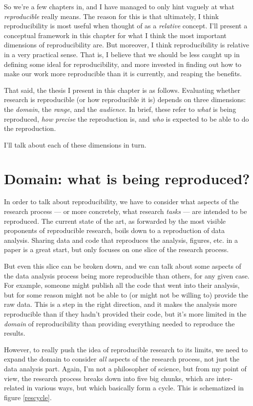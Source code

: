 \documentclass{book}
\begin{document}
So we're a few chapters in, and I have managed to only hint vaguely at what \emph{reproducible} really means.  The reason for this is that ultimately, I think reproducibility is most useful when thought of as a \emph{relative} concept. I'll present a conceptual framework in this chapter for what I think the most important dimensions of reproducibility are. But moreover, I think reproducibility is relative in a very practical sense. That is, I believe that we should be less caught up in defining some ideal for reproducibility, and more invested in finding out how to make our work more reproducible than it is currently, and reaping the benefits.

That said, the thesis I present in this chapter is as follows. Evaluating whether research is reproducible (or how reproducible it is) depends on three dimensions: the \emph{domain}, the \emph{range}, and the \emph{audience}.  In brief, these refer to \emph{what} is being reproduced, \emph{how precise} the reproduction is, and \emph{who} is expected to be able to do the reproduction. 

I'll talk about each of these dimensions in turn.
\section{Domain: what is being reproduced?}
\label{sec-3-1}
\label{domain}

In order to talk about reproducibility, we have to consider what aspects of the research process --- or more concretely, what research \emph{tasks} --- are intended to be reproduced.  The current state of the art, as forwarded by the most visible proponents of reproducible research, boils down to a reproduction of data analysis. Sharing data and code that reproduces the analysis, figures, etc. in a paper is a great start, but only focuses on one slice of the research process.

But even this slice can be broken down, and we can talk about some aspects of the data analysis process being more reproducible than others, for any given case.  For example, someone might publish all the code that went into their analysis, but for some reason might not be able to (or might not be willing to) provide the raw data. This is a step in the right direction, and it makes the analysis more reproducible than if they hadn't provided their code, but it's more limited in the \emph{domain} of reproducibility than providing everything needed to reproduce the results.

However, to really push the idea of reproducible research to its limits, we need to expand the domain to consider \emph{all} aspects of the research process, not just the data analysis part.  Again, I'm not a philosopher of science, but from my point of view, the research process breaks down into five big chunks, which are inter-related in various ways, but which basically form a cycle.  This is schematized in figure \ref{rescycle}.  
\end{document}
